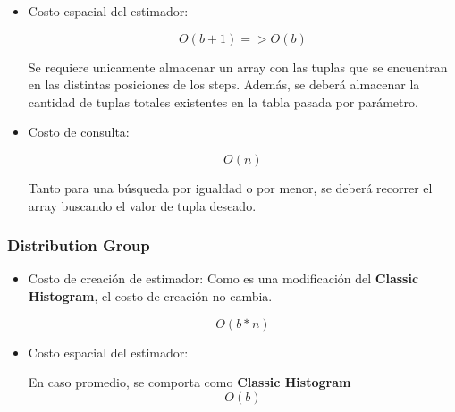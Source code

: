 \documentclass[10pt, a4paper,english,spanish,hidelinks]{article}
\begin{document}
{\begin{itemize}
\begin{equation}
O(n*log(n) + n + n) => O(n*log(n))
\end{equation}

El algoritmo consiste en el ordenamiento de las tuplas de acuerdo a la columna pasada por
parámetro. El ordanamiento lo realiza el motor de la base de datos en costo $O(n*log(n))$.
Por otro lado se deberá calcular el máximo, mínimo y total de tuplas existentes en la base.

\item Costo espacial del estimador:

\begin{equation}
O(b + 1) => O(b)
\end{equation}

Se requiere unicamente almacenar un array con las tuplas que se encuentran en las distintas
posiciones de los steps. Además, se deberá almacenar la cantidad de tuplas totales
existentes en la tabla pasada por parámetro.

\item Costo de consulta:

\begin{equation}
O(n)
\end{equation}

Tanto para una búsqueda por igualdad o por menor, se deberá recorrer el array buscando
el valor de tupla deseado.

\end{itemize}



\subsubsection{Distribution Group}

\begin{itemize}

\item Costo de creación de estimador:
Como es una modificación del \textbf{Classic Histogram}, el costo de creación no cambia.

\begin{equation}
O(b * n)
\end{equation}

\item Costo espacial del estimador:

En caso promedio, se comporta como \textbf{Classic Histogram}
\begin{equation}
O(b)
\end{equation}


\end{itemize}}
\end{document}
